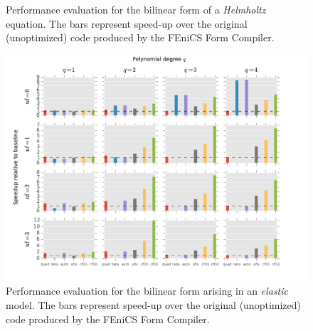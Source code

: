 \begin{figure}
\caption{Performance evaluation for the bilinear form of a \textit{Helmholtz} equation. The bars represent speed-up over the original (unoptimized) code produced by the FEniCS Form Compiler.}\label{fig:helmholtz}
\end{figure}

\begin{figure}
\includegraphics[scale=0.77]{optimality/perf-results/elasticity}
\caption{Performance evaluation for the bilinear form arising in an \textit{elastic} model. The bars represent speed-up over the original (unoptimized) code produced by the FEniCS Form Compiler.}\label{fig:elasticity}
\end{figure}

